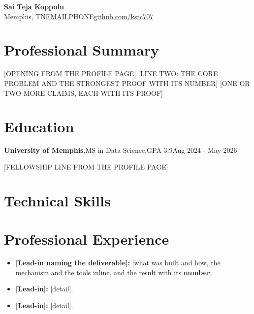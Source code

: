 

\begin{center}
{\LARGE\bfseries Sai Teja Koppolu}\\[2pt]
{\small Memphis, TN\dotsep \href{mailto:EMAIL}{EMAIL}\dotsep PHONE\dotsep \href{https://github.com/kstc707}{github.com/kstc707}}
\end{center}
\vspace{-4pt}
\section*{Professional Summary}
[OPENING FROM THE PROFILE PAGE] [LINE TWO: THE CORE PROBLEM AND THE STRONGEST PROOF WITH ITS NUMBER] [ONE OR TWO MORE CLAIMS, EACH WITH ITS PROOF]
\section*{Education}
\textbf{University of Memphis}\sep MS in Data Science\sep GPA 3.9\hfill Aug 2024 - May 2026\par
{\small [FELLOWSHIP LINE FROM THE PROFILE PAGE]}\par
\section*{Technical Skills}
\vspace{-0.6pt}
\section*{Professional Experience}
\vspace{-1.5pt}
\begin{itemize}
\item \textbf{[Lead-in naming the deliverable]:} [what was built and how, the mechanism and the tools inline, and the result with its \textbf{number}].
\item \textbf{[Lead-in]:} [detail].
\end{itemize}
\role{[TITLE]}{[EMPLOYER]}{[LOCATION]}{[START] - [END]}
\begin{itemize}
\item \textbf{[Lead-in]:} [detail].
\end{itemize}
